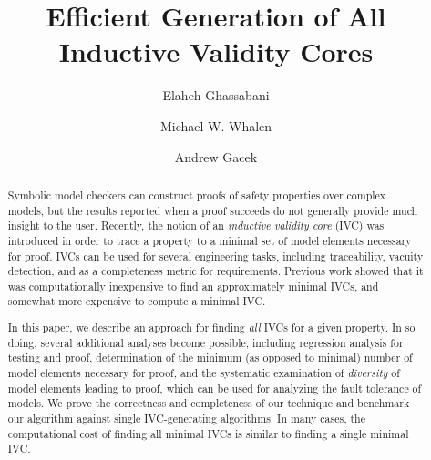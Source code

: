 \documentclass{llncs}
\begin{document}
\newcommand{\mike}[1]{\textcolor{red}{#1}}
\newcommand{\fixed}[1]{\textcolor{purple}{#1}}
\newcommand{\andrew}[1]{\textcolor{green}{#1}}
\newcommand{\ela}[1]{\textcolor{blue}{#1}}
\newcommand{\stateequiv}{\equiv_{s}}
\newcommand{\traceequiv}{\equiv_{\sigma}}
\newcommand{\ta}{\text{TA}}
\newcommand{\cta}{\text{TA$_{C}$}}
\newcommand{\tta}{\text{TA$_{T}$}}
\newcommand{\ucalg}{\texttt{\small{IVC\_UC}}}
\newcommand{\ucbfalg}{\texttt{\small{IVC\_UCBF}}}


\title{Efficient Generation of All Inductive Validity Cores}

\author{Elaheh Ghassabani
\and Michael W. Whalen
\and Andrew Gacek }
\maketitle

\begin{abstract}
Symbolic model checkers can construct proofs of safety properties over complex models, but the results reported when a proof succeeds do not generally provide much insight to the user.  Recently, the notion of an {\em inductive validity core} (IVC) was introduced in order to trace a property to a minimal set of model elements necessary for proof.  IVCs can be used for several engineering tasks, including traceability, vacuity detection, and as a completeness metric for requirements.  Previous work showed that it was computationally inexpensive to find an approximately minimal IVCs, and somewhat more expensive to compute a minimal IVC.

In this paper, we describe an approach for finding {\em all} IVCs for a given property.  In so doing, several additional analyses become possible, including regression analysis for testing and proof, determination of the minimum (as opposed to minimal) number of model elements necessary for proof, and the systematic examination of {\em diversity} of model elements leading to proof, which can be used for analyzing the fault tolerance of models.  We prove the correctness and completeness of our technique and benchmark our algorithm against single IVC-generating algorithms.  In many cases, the computational cost of finding all minimal IVCs is similar to finding a single minimal IVC.
\end{abstract}
\end{document}

